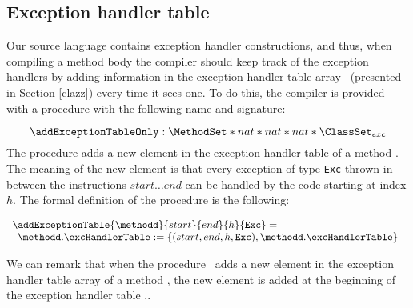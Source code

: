 
\subsection{Exception handler table}\label{pogEq:compile:excHandlers}

Our source language contains exception handler constructions, and thus, when compiling a method body
the compiler should keep track of the exception handlers by adding information 
in the exception handler table array \excHandlerTable \ (presented in Section \ref{clazz})   every time it sees one.
 To do this, the compiler is provided with a procedure with the following name and signature:

$$ \addExceptionTableOnly : \MethodSet *  nat * nat * nat *  \ClassSet_{exc}   $$
The procedure adds a  new element in the exception handler table
of a method \methodd. The meaning of the new element is that 
every exception of type \mbox{\rm\texttt{Exc}}  thrown in between the instructions $start \ldots end$ can be handled by 
the code starting at index $h$.	
The formal definition of the procedure is the following:

$$ \begin{array}{l}
  \addExceptionTable{\methodd}{ start }{ end  }{ h}{  \mbox{\rm\texttt{Exc}} }  = \\
   \begin{array}{l}
         \methodd.\excHandlerTable := \{ (start, end, h,  \mbox{\rm\texttt{Exc}}   ) , \methodd.\excHandlerTable \}

   \end{array}
\end{array}$$


We can remark that when the procedure  \addExceptionTableOnly \  adds a new element in the exception handler table array
of a method \methodd, the new element is added at the beginning of the  exception handler table   \methodd.\excHandlerTable.

